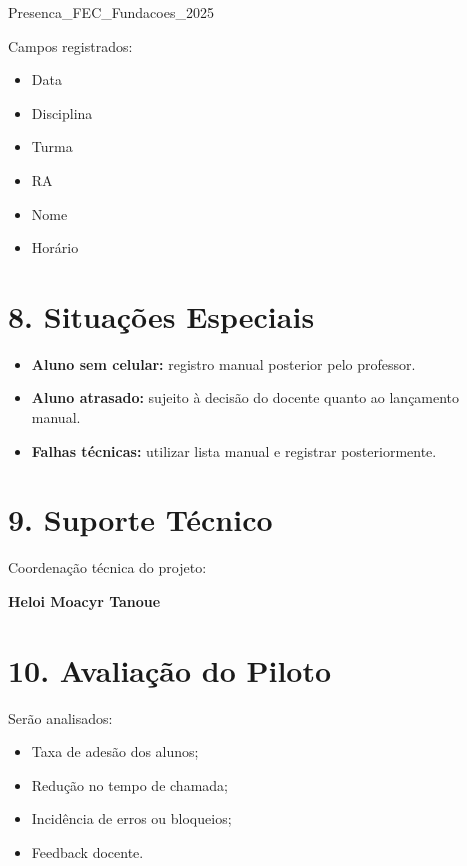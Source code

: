 \documentclass[12pt,a4paper]{article}
\begin{document}
\begin{center}
    Presenca\_FEC\_Fundacoes\_2025
\end{center}

Campos registrados:

\begin{itemize}
    \item Data
    \item Disciplina
    \item Turma
    \item RA
    \item Nome
    \item Horário
\end{itemize}


\section*{8. Situações Especiais}

\begin{itemize}
    \item \textbf{Aluno sem celular:} registro manual posterior pelo professor.
    \item \textbf{Aluno atrasado:} sujeito à decisão do docente quanto ao lançamento manual.
    \item \textbf{Falhas técnicas:} utilizar lista manual e registrar posteriormente.
\end{itemize}


\section*{9. Suporte Técnico}

Coordenação técnica do projeto:

\begin{center}
    \textbf{Heloi Moacyr Tanoue}
\end{center}


\section*{10. Avaliação do Piloto}

Serão analisados:

\begin{itemize}
    \item Taxa de adesão dos alunos;
    \item Redução no tempo de chamada;
    \item Incidência de erros ou bloqueios;
    \item Feedback docente.
\end{itemize}
\end{document}
